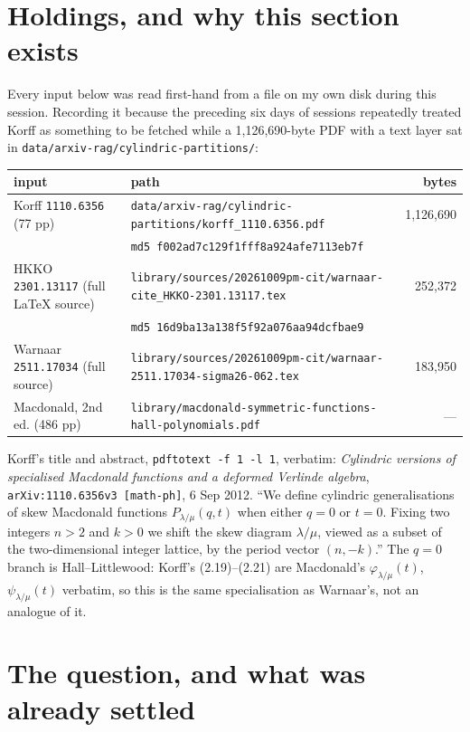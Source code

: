 \documentclass[11pt]{article}
\theoremstyle{definition}
\newcommand{\la}{\lambda}
\begin{document}
\section{Holdings, and why this section exists}

Every input below was read first-hand from a file on my own disk during this
session. Recording it because the preceding six days of sessions repeatedly
treated Korff \cite{K} as something to be fetched while a 1{,}126{,}690-byte
PDF with a text layer sat in \texttt{data/arxiv-rag/cylindric-partitions/}:

\begin{center}
\begin{tabular}{llr}
\hline
input & path & bytes \\
\hline
Korff \texttt{1110.6356} (77 pp) & \texttt{data/arxiv-rag/cylindric-partitions/korff\_1110.6356.pdf} & 1{,}126{,}690 \\
 & \texttt{md5 f002ad7c129f1fff8a924afe7113eb7f} & \\
HKKO \texttt{2301.13117} (full \LaTeX{} source) & \texttt{library/sources/20261009pm-cit/warnaar-cite\_HKKO-2301.13117.tex} & 252{,}372 \\
 & \texttt{md5 16d9ba13a138f5f92a076aa94dcfbae9} & \\
Warnaar \texttt{2511.17034} (full source) & \texttt{library/sources/20261009pm-cit/warnaar-2511.17034-sigma26-062.tex} & 183{,}950 \\
Macdonald, 2nd ed. (486 pp) & \texttt{library/macdonald-symmetric-functions-hall-polynomials.pdf} & --- \\
\hline
\end{tabular}
\end{center}

Korff's title and abstract, \texttt{pdftotext -f 1 -l 1}, verbatim:
\emph{Cylindric versions of specialised Macdonald functions and a deformed
Verlinde algebra}, \texttt{arXiv:1110.6356v3 [math-ph]}, 6 Sep 2012. ``We
define cylindric generalisations of skew Macdonald functions $P_{\la/\mu}(q,t)$
when either $q=0$ or $t=0$. Fixing two integers $n>2$ and $k>0$ we shift the
skew diagram $\la/\mu$, viewed as a subset of the two-dimensional integer
lattice, by the period vector $(n,-k)$.'' The $q=0$ branch is Hall--Littlewood:
Korff's (2.19)--(2.21) are Macdonald's $\varphi_{\la/\mu}(t)$,
$\psi_{\la/\mu}(t)$ verbatim, so this is the same specialisation as Warnaar's,
not an analogue of it.

\section{The question, and what was already settled}\label{sec:setup}
\end{document}
